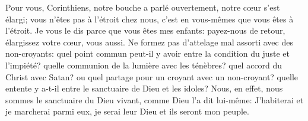 Pour vous, Corinthiens,
	notre bouche a parlé ouvertement, notre cœur s’est élargi;
	vous n’êtes pas à l’étroit chez nous,
	c’est en vous-mêmes que vous êtes à l’étroit.
Je vous le dis parce que vous êtes mes enfants:
	payez-nous de retour, élargissez votre cœur, vous aussi.
Ne formez pas d’attelage mal assorti avec des non-croyants:
	quel point commun peut-il y avoir entre la condition du juste et l’impiété?
	quelle communion de la lumière avec les ténèbres?
	quel accord du Christ avec Satan?
	ou quel partage pour un croyant avec un non-croyant?
	quelle entente y a-t-il entre le sanctuaire de Dieu et les idoles?
Nous, en effet, nous sommes le sanctuaire du Dieu vivant,
	comme Dieu l’a dit lui-même:
	J’habiterai et je marcherai parmi eux,
	je serai leur Dieu et ils seront mon peuple.
